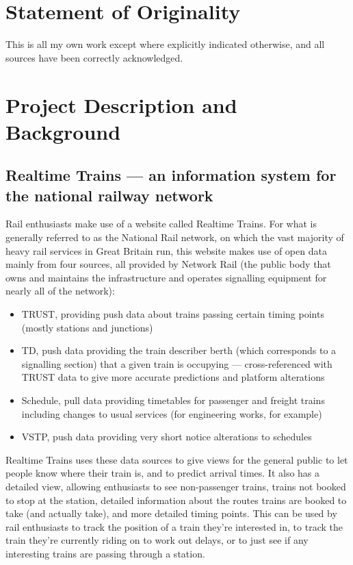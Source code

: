 \documentclass[a4paper,12pt]{article}
\begin{document}
\tableofcontents

\pagebreak

\section*{Statement of Originality}

This is all my own work except where explicitly indicated otherwise, and all
sources have been correctly acknowledged.

\pagebreak

\section{Project Description and Background}

\subsection{Realtime Trains --- an information system for the national railway network}

Rail enthusiasts make use of a website called Realtime Trains. For what is
generally referred to as the National Rail network, on which the vast majority
of heavy rail services in Great Britain run, this website makes use of open
data mainly from four sources, all provided by Network Rail (the public body
that owns and maintains the infrastructure and operates signalling
equipment for nearly all of the network)\cite{RTTData}:

\begin{itemize}
  \item TRUST, providing push data about trains passing certain timing points
    (mostly stations and junctions)
  \item TD, push data providing the train describer berth (which corresponds to
    a signalling section) that a given train is occupying --- cross-referenced
    with TRUST data to give more accurate predictions and platform alterations
  \item Schedule, pull data providing timetables for passenger and freight
    trains including changes to usual services (for engineering works, for
    example)
  \item VSTP, push data providing very short notice alterations to schedules
\end{itemize}

Realtime Trains uses these data sources to give views for the general public to
let people know where their train is, and to predict arrival times. It also has
a detailed view, allowing enthusiasts to see non-passenger trains, trains not
booked to stop at the station, detailed information about the routes trains are
booked to take (and actually take), and more detailed timing points. This can
be used by rail enthusiasts to track the position of a train they're interested
in, to track the train they're currently riding on to work out delays, or to
just see if any interesting trains are passing through a station.
\end{document}
